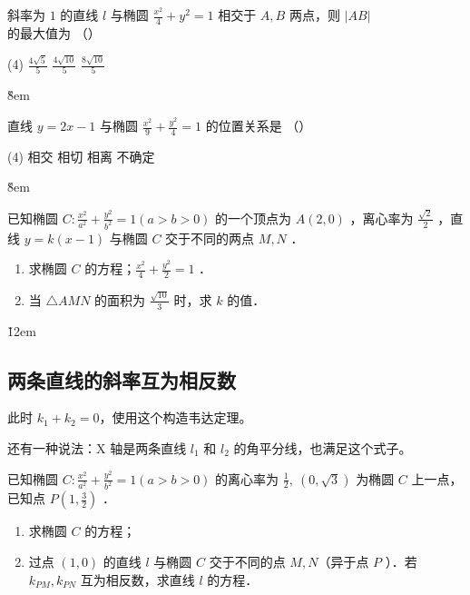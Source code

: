 \begin{example}
    斜率为 $1$ 的直线 $l$ 与椭圆 $\frac{x^2}{4}+y^2=1$ 相交于 $A, B$ 两点，则 $|A B|$ 的最大值为 （\qquad）
    \begin{tasks}(4)
        \task $\frac{4 \sqrt{5}}{5}$
        \task $\frac{4 \sqrt{10}}{5}$
        \task $\frac{8 \sqrt{10}}{5}$
    \end{tasks}
\end{example}

\v{8em}

\begin{example}
    直线 $y=2 x-1$ 与椭圆 $\frac{x^2}{9}+\frac{y^2}{4}=1$ 的位置关系是 （\qquad）
    \begin{tasks}(4)
        \task 相交
        \task 相切
        \task 相离
        \task 不确定
    \end{tasks}
\end{example}

\v{8em}

\begin{example}
    已知椭圆 $C: \frac{x^2}{a^2}+\frac{y^2}{b^2}=1(a>b>0)$ 的一个顶点为 $A(2,0)$ ，离心率为 $\frac{\sqrt{2}}{2}$ ，直线 $y=k(x-1)$ 与椭圆 $C$ 交于不同的两点 $M, N$ ．
    \begin{enumerate}
        \item 求椭圆 $C$ 的方程；$\frac{x^2}{4}+\frac{y^2}{2}=1$ ．
        \item 当 $\triangle A M N$ 的面积为 $\frac{\sqrt{10}}{3}$ 时，求 $k$ 的值．
    \end{enumerate}
\end{example}

\v{12em}

\subsection{两条直线的斜率互为相反数}

\begin{theorem}
    此时 $k_1 + k_2 = 0$，使用这个构造韦达定理。

    \begin{warning}
        还有一种说法：X 轴是两条直线 $l_1$ 和 $l_2$ 的角平分线，也满足这个式子。
    \end{warning}
\end{theorem}

\begin{example}
    已知椭圆 $C: \frac{x^2}{a^2}+\frac{y^2}{b^2}=1(a>b>0)$ 的离心率为 $\frac{1}{2}, ~(0, \sqrt{3})$ 为椭圆 $C$ 上一点，已知点 $P\left(1, \frac{3}{2}\right)$ ．
    \begin{enumerate}
        \item 求椭圆 $C$ 的方程；
        \item 过点 $(1,0)$ 的直线 $l$ 与椭圆 $C$ 交于不同的点 $M, N$（异于点 $P$ ）．若$k_{P M},k_{P N}$ 互为相反数，求直线 $l$ 的方程．
    \end{enumerate}
\end{example}